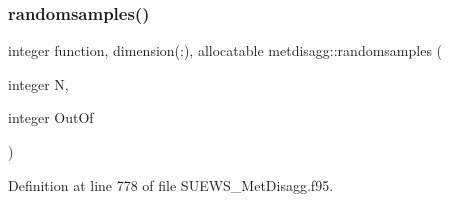 \subsubsection{\texorpdfstring{randomsamples()}{randomsamples()}}
{\footnotesize\ttfamily integer function, dimension(\+:), allocatable metdisagg\+::randomsamples (\begin{DoxyParamCaption}\item[{integer}]{N,  }\item[{integer}]{Out\+Of }\end{DoxyParamCaption})}



Definition at line 778 of file S\+U\+E\+W\+S\+\_\+\+Met\+Disagg.\+f95.

